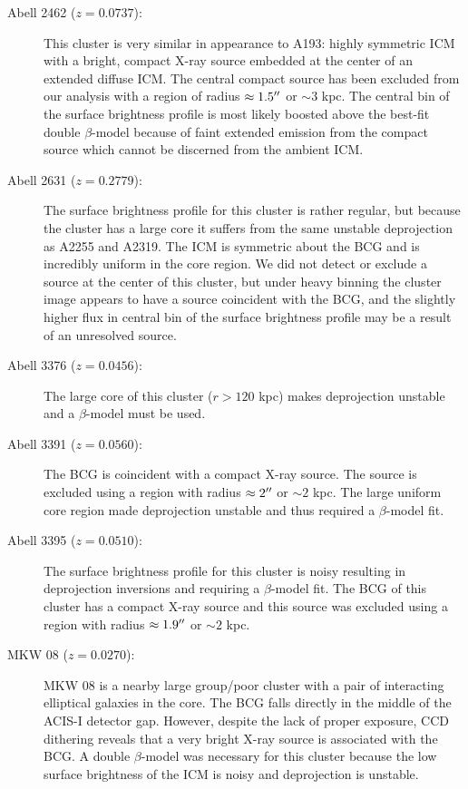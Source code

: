 \begin{appendix}
\begin{description}
\item[Abell 2462 ($z=0.0737$):] This cluster is very similar in
  appearance to A193: highly symmetric ICM with a bright, compact
  X-ray source embedded at the center of an extended diffuse ICM. The
  central compact source has been excluded from our analysis with a
  region of radius $\approx 1.5\mbox{$^{\prime\prime}$}$ or $\sim 3$ kpc. The central
  bin of the surface brightness profile is most likely boosted above
  the best-fit double $\beta$-model because of faint extended emission
  from the compact source which cannot be discerned from the ambient
  ICM.

\item[Abell 2631 ($z=0.2779$):] The surface brightness profile for
  this cluster is rather regular, but because the cluster has a large
  core it suffers from the same unstable deprojection as A2255 and
  A2319. The ICM is symmetric about the BCG and is incredibly uniform
  in the core region. We did not detect or exclude a source at the
  center of this cluster, but under heavy binning the cluster image
  appears to have a source coincident with the BCG, and the slightly
  higher flux in central bin of the surface brightness profile may be
  a result of an unresolved source.

\item[Abell 3376 ($z=0.0456$):] The large core of this cluster ($r >
  120$ kpc) makes deprojection unstable and a $\beta$-model must be
  used.

\item[Abell 3391 ($z=0.0560$):] The BCG is coincident with a compact
  X-ray source. The source is excluded using a region with radius
  $\approx 2\mbox{$^{\prime\prime}$}$ or $\sim 2$ kpc. The large uniform core region
  made deprojection unstable and thus required a $\beta$-model fit.

\item[Abell 3395 ($z=0.0510$):] The surface brightness profile for
  this cluster is noisy resulting in deprojection inversions and
  requiring a $\beta$-model fit. The BCG of this cluster has a compact
  X-ray source and this source was excluded using a region with radius
  $\approx 1.9\mbox{$^{\prime\prime}$}$ or $\sim 2$ kpc.

\item[MKW 08 ($z=0.0270$):] MKW 08 is a nearby large group/poor
  cluster with a pair of interacting elliptical galaxies in the
  core. The BCG falls directly in the middle of the ACIS-I detector
  gap. However, despite the lack of proper exposure, CCD dithering
  reveals that a very bright X-ray source is associated with the
  BCG. A double $\beta$-model was necessary for this cluster because
  the low surface brightness of the ICM is noisy and deprojection is
  unstable.


\end{description}
\end{appendix}
